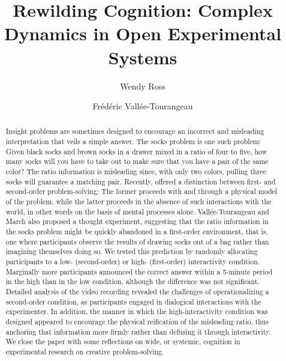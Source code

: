 \documentclass[twocolumn, serif, empirical, authordate]{jote-article}
\title{Rewilding Cognition: Complex Dynamics in Open Experimental Systems}
\author[1,2]{Wendy Ross}
\author[2]{Frédéric Vallée-Tourangeau}
\affil[1]{Kingston University}
\affil[2]{London Metropolitan University}
\begin{document}
\begin{frontmatter}
\maketitle
\begin{abstract}
     Insight problems are sometimes designed to encourage an incorrect and misleading interpretation that veils a simple answer. The socks problem is one such problem: Given black socks and brown socks in a drawer mixed in a ratio of four to five, how many socks will you have to take out to make sure that you have a pair of the same color? The ratio information is misleading since, with only two colors, pulling three socks will guarantee a matching pair. Recently, \textcite{Vallee-Tourangeau2020} offered a distinction between first- and second-order problem-solving: The former proceeds with and through a physical model of the problem, while the latter proceeds in the absence of such interactions with the world, in other words on the basis of mental processes alone. Vallée-Tourangeau and March also proposed a thought experiment, suggesting that the ratio information in the socks problem might be quickly abandoned in a first-order environment, that is, one where participants observe the results of drawing socks out of a bag rather than imagining themselves doing so. We tested this prediction by randomly allocating participants to a low- (second-order) or high- (first-order) interactivity condition. Marginally more participants announced the correct answer within a 5-minute period in the high than in the low condition, although the difference was not significant. Detailed analysis of the video recording revealed the challenges of operationalizing a second-order condition, as participants engaged in dialogical interactions with the experimenter. In addition, the manner in which the high-interactivity condition was designed appeared to encourage the physical reification of the misleading ratio, thus anchoring that information more firmly rather than defusing it through interactivity. We close the paper with some reflections on wide, or systemic, cognition in experimental research on creative problem-solving.
     \end{abstract}
\end{frontmatter}
\end{document}
